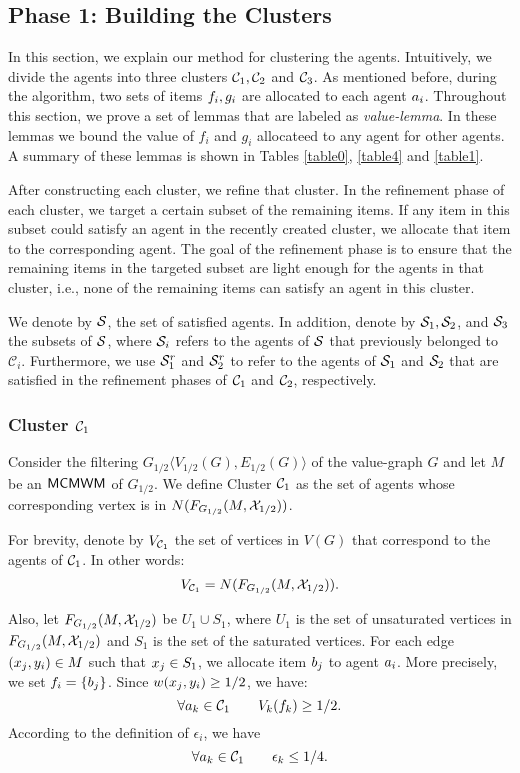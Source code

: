 \subsection{Phase 1: Building the Clusters}\label{additive:clusters}
In this section, we explain our method for clustering the agents. Intuitively, we divide the agents into three clusters $\mathcal{C}_1,\mathcal{C}_2$ and $\mathcal{C}_3$. As mentioned before, during the algorithm, two sets of items $f_i,g_i$ are allocated to each agent $a_i$. Throughout this section, we prove a set of lemmas that are labeled as \emph{value-lemma}. In these lemmas we bound the value of $f_i$ and $g_i$ allocateed to any agent for other agents. A summary of these lemmas is shown in Tables \ref{table0}, \ref{table4} and \ref{table1}. 


After constructing each cluster, we refine that cluster. In the refinement phase of each cluster, we target a certain subset of the remaining items. If any item in this subset could satisfy an agent in the recently created cluster, we allocate that item to the corresponding agent. The goal of the refinement phase is to ensure that the remaining items in the targeted subset are light enough for the agents in that cluster, i.e., none of the remaining items can satisfy an agent in this cluster.

We denote by $\mathcal{S}$, the set of satisfied agents. In addition, denote by $\mathcal{S}_1, \mathcal{S}_2$, and $\mathcal{S}_3$ the subsets of $\mathcal{S}$, where $\mathcal{S}_i$ refers to the agents of $\mathcal{S}$ that previously belonged to ${\mathcal C}_i$. Furthermore, we use $\mathcal{S}_1^r$ and $\mathcal{S}_2^r$ to refer to the agents of $\mathcal{S}_1$ and $\mathcal{S}_2$ that are satisfied in the refinement phases of $\mathcal{C}_1$ and $\mathcal{C}_2$, respectively.
\subsubsection{Cluster $\mathcal{C}_1$} \label{cluster1:building}
Consider the filtering $G_{1/2}\langle V_{1/2}(G),E_{1/2}(G) \rangle$ of the value-graph $G$ and let $M$ be an $\textsf{MCMWM}$ of $G_{1/2}$. We define Cluster $\mathcal{C}_1$ as the set of agents whose corresponding vertex is in $N(F_{G_{1/2}}(M,\mathcal{X}_{1/2}))$. 

For brevity, denote by $V_{\mathcal{C}_1}$ the set of vertices in $V(G)$ that correspond to the agents of $\mathcal{C}_1$. In other words:
$$V_{\mathcal{C}_1} = N(F_{G_{1/2}}(M,\mathcal{X}_{1/2})).$$



 
Also, let $F_{G_{1/2}}(M,\mathcal{X}_{1/2}) $ be $U_1 \cup S_1$, where $U_1$ is the set of unsaturated vertices in $F_{G_{1/2}}(M,\mathcal{X}_{1/2})$ and $S_1$ is the set of the saturated vertices. For each edge $(x_j,y_i) \in M$ such that $x_j \in S_1$, we allocate  item $b_j$ to agent $a_i$. More precisely, we set $f_i = \{b_j \}$. Since $w(x_j,y_i)\geq {1/2}$, we have:
$$\forall a_k \in \mathcal{C}_1 \qquad V_k(f_k) \geq {1/2}.$$
According to the definition of $\epsilon_i$, we have
\begin{equation}
\forall a_k \in \mathcal{C}_1 \qquad \epsilon_k \leq {1/4}.
\end{equation} 

